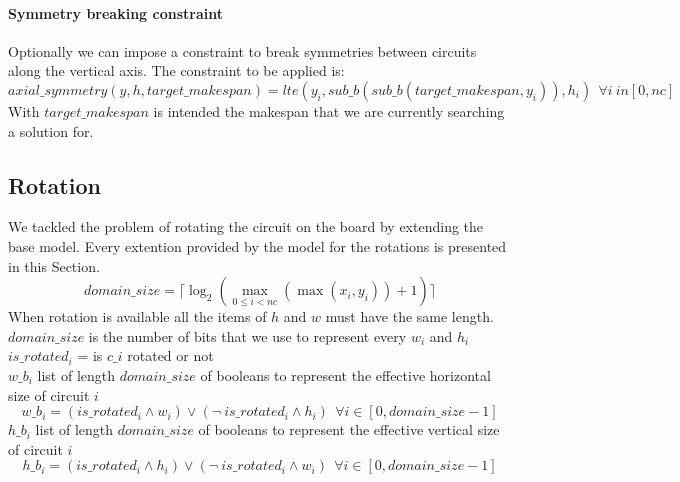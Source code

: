 
    \paragraph*{Symmetry breaking constraint}
    Optionally we can impose a constraint to break symmetries between circuits along the vertical axis.
    The constraint to be applied is:
    \begin{equation*}
      axial\_symmetry(y, h, target\_makespan) = lte(y_i, sub\_b(sub\_b(target\_makespan, y_i)), h_i) \ \ \forall i \ in [0, nc]
    \end{equation*}
    With \(target\_makespan\) is intended the makespan that we are currently searching a solution for.


\subsection{Rotation}\label{subsec:SAT_rotation}
  We tackled the problem of rotating the circuit on the board by extending the base model. Every
  extention provided by the model for the rotations is presented in this Section.\\
  \begin{equation*}
    domain\_size = \lceil \log_2 (\max_{0 \leq i < nc} (\max(x_i, y_i)) + 1) \rceil
  \end{equation*}
  When rotation is available all the items of \(h\) and \(w\) must have the same length.
  \(domain\_size \) is the number of bits that we use to represent every \(w_i\) and \(h_i\)\\
    \(is\_rotated_i\) = is \(c\_i\) rotated or not\\
  \(w\_b_i\) list of length \(domain\_size \) of booleans to represent the effective horizontal size of circuit \(i\)
  \begin{equation*}
    w\_b_i = (is\_rotated_i \land w_i) \lor (\neg \ is\_rotated_i \land h_i) \ \ \forall i \in [0, domain\_size-1] 
  \end{equation*}
  \(h\_b_i\) list of length \(domain\_size \) of booleans to represent the effective vertical size of circuit \(i\)
  \begin{equation*}
    h\_b_i = (is\_rotated_i \land h_i) \lor (\neg \ is\_rotated_i \land w_i) \ \ \forall i \in [0, domain\_size-1] 
  \end{equation*}  

